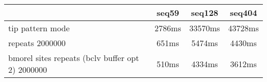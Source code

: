 \begin{tabular}{|l|c|c|c|}
\hline
 & seq59 & seq128 & seq404  \\
\hline
tip pattern mode &  2786ms &  33570ms &  43728ms\\
\hline
repeats 2000000 &  651ms &  5474ms &  4430ms\\
\hline
bmorel sites repeats (bclv buffer opt 2) 2000000 &  510ms &  4334ms &  3612ms\\
\hline
\end{tabular}
